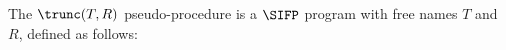 \begin{defn}
  \label{def:trunc}
The $\trunc(T, R)$ pseudo-procedure is a $\SIFP$ program with free names $T$ and $R$, defined as follows:

\begin{comment}
\begin{align*}
trunc(T, R) \coloneqq &Q \takes R;\\
                      &R \takes \epsilon;\\
                      &Z \takes \epsilon;\\
                      &\while {Z \sqsubset T} {\\
                      &\quad B \takes \one;\\
                      &\quad \while {Z.\zero \sqsubseteq T \land B} {\\
                      &\quad \quad B \takes \one;\\
                      &\quad \quad \while {R.\zero \sqsubseteq Q \land B} {\\
                      &\quad \quad \quad R \takes R.\zero;\\
                      &\quad \quad \quad B \takes \zero;\\
                      &\quad \quad \quad }\\
                      &\quad \quad \while {R.\one \sqsubseteq Q \land B} {\\
                      &\quad \quad \quad R \takes R.\one;\\
                      &\quad \quad \quad B \takes \zero;\\
                      &\quad \quad \quad }\\
                      &\quad \quad Z \takes Z.0;\\
                      &\quad \quad B \takes 0;\\
                      &\quad \quad }\\
                      &\quad \while {Z.\one \sqsubseteq T \land B} {\\
                      &\quad \quad B \takes \one;\\
                      &\quad \quad \while {R.\zero \sqsubseteq Q \land B} {\\
                      &\quad \quad \quad R \takes R.\zero;\\
                      &\quad \quad \quad B \takes \zero;\\
                      &\quad \quad \quad }\\

\end{comment}
\end{defn}
